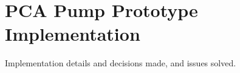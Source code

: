 
\cleardoublepage


\chapter{PCA Pump Prototype Implementation}
\label{pcapumpimpl}

Implementation details and decisions made, and issues solved.
